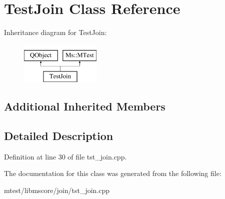 \hypertarget{class_test_join}{}\section{Test\+Join Class Reference}
\label{class_test_join}
Inheritance diagram for Test\+Join\+:\begin{figure}[H]
\begin{center}
\leavevmode
\includegraphics[height=2.000000cm]{class_test_join}
\end{center}
\end{figure}
\subsection*{Additional Inherited Members}


\subsection{Detailed Description}


Definition at line 30 of file tst\+\_\+join.\+cpp.



The documentation for this class was generated from the following file\+:\begin{DoxyCompactItemize}
\item 
mtest/libmscore/join/tst\+\_\+join.\+cpp\end{DoxyCompactItemize}
